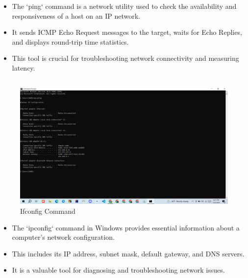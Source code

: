 \documentclass[11pt]{article}
\begin{document}
\begin{itemize}
  \item The `ping` command is a network utility used to check the availability and responsiveness of a host on an IP network.
  \item It sends ICMP Echo Request messages to the target, waits for Echo Replies, and displays round-trip time statistics.
  \item This tool is crucial for troubleshooting network connectivity and measuring latency.
\end{itemize}

\subsection{}
\begin{figure}[!h]
\centering
\includegraphics[width=\textwidth]{Screenshot (2).png}
\caption{Ifconfig Command}
\end{figure}

\begin{itemize}
  \item The `ipconfig` command in Windows provides essential information about a computer's network configuration.
  \item This includes its IP address, subnet mask, default gateway, and DNS servers.
  \item It is a valuable tool for diagnosing and troubleshooting network issues.
\end{itemize}
\end{document}
